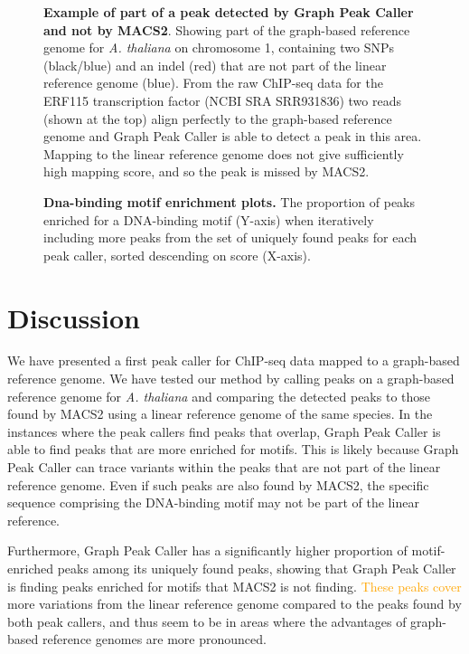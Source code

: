 \documentclass[10pt,letterpaper]{article}
\newcommand{\revision}[1]{\textcolor{orange}{#1}}
\begin{document}
\begin{figure}[!h]
 \caption{{\bf Example of part of a peak detected by Graph Peak Caller and not by MACS2}. Showing part of the graph-based reference genome for \emph{A. thaliana} on chromosome 1, containing two SNPs (black/blue) and an indel (red) that are not part of the linear reference genome (blue).
   From the raw ChIP-seq data for the ERF115 transcription factor (NCBI SRA SRR931836) two reads (shown at the top) align perfectly to the graph-based reference genome and Graph Peak Caller is able to detect a peak in this area.
   Mapping to the linear reference genome does not give sufficiently high mapping score, and so the peak is missed by MACS2. }

\label{motif_enrichment_reads}
\end{figure}


\begin{figure}[!h]
 \caption{{\bf Dna-binding motif enrichment plots.} The proportion of peaks enriched for a DNA-binding motif (Y-axis) when iteratively including more peaks from the set of uniquely found peaks for each peak caller, sorted descending on score (X-axis). }
\label{motif_plots}
\end{figure}



\section*{Discussion}
We have presented a first peak caller for ChIP-seq data mapped to a graph-based reference genome. We have tested our method by calling peaks on a graph-based reference genome for \emph{A. thaliana} and comparing the detected peaks to those found by MACS2 using a linear reference genome of the same species. In the instances where the peak callers find peaks that overlap, Graph Peak Caller is able to find peaks that are more enriched for motifs. This is likely because Graph Peak Caller can trace variants within the peaks that are not part of the linear reference genome. Even if such peaks are also found by MACS2, the specific sequence comprising the DNA-binding motif may not be part of the linear reference.
	
Furthermore, Graph Peak Caller has a significantly higher proportion of motif-enriched peaks among its uniquely found peaks, showing that Graph Peak Caller is finding peaks enriched for motifs that MACS2 is not finding.
\revision{These peaks cover} more variations from the linear reference genome compared to the peaks found by both peak callers, and thus seem to be in areas where the advantages of graph-based reference genomes are more pronounced. 
\end{document}
